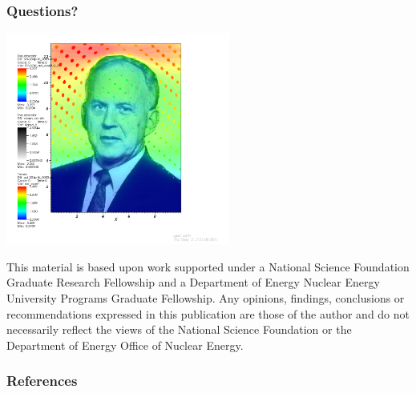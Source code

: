 \documentclass{beamer}
\begin{document}
\begin{frame}
  \frametitle{Questions?}

{\par\centering%
  \includegraphics[height=2.75in]{../figures/larsen}

}
{\vspace{-.25in}%
\setlength{\baselineskip}{-\baselineskip} \tiny 
This material is based upon work supported under a National Science Foundation
Graduate Research Fellowship and a Department of Energy Nuclear Energy
University Programs Graduate Fellowship. Any opinions, findings, conclusions or
recommendations expressed in this publication are those of the author and do
not necessarily reflect the views of the National Science Foundation or the
Department of Energy Office of Nuclear Energy.\par}
\end{frame}

\begin{frame}
  \frametitle{References}


\end{frame}

\end{document}
